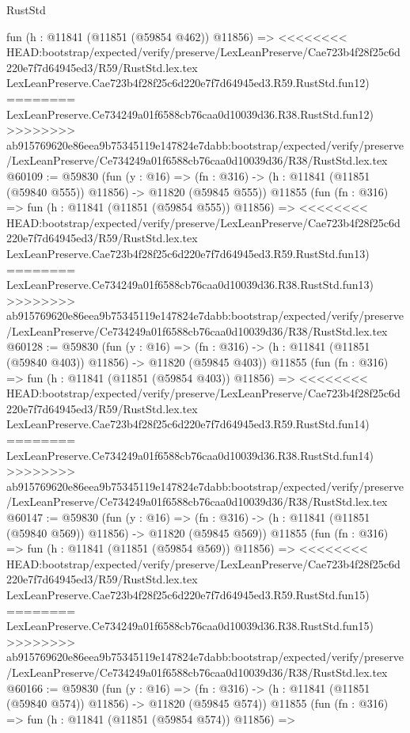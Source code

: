 \begin{lexlean}{RustStd}
\begin{coremodule}
{\begin{coremodule}
{{{{{{{{{{{{{{{{{{{{{{{{{{{{{{{{{{{{{{{{{{{{{{{{{{    fun (h : @11841 (@11851 (@59854 @462)) @11856) =>
<<<<<<<< HEAD:bootstrap/expected/verify/preserve/LexLeanPreserve/Cae723b4f28f25c6d220e7f7d64945ed3/R59/RustStd.lex.tex
    LexLeanPreserve.Cae723b4f28f25c6d220e7f7d64945ed3.R59.RustStd.fun12)
========
    LexLeanPreserve.Ce734249a01f6588cb76caa0d10039d36.R38.RustStd.fun12)
>>>>>>>> ab915769620e86eea9b75345119e147824e7dabb:bootstrap/expected/verify/preserve/LexLeanPreserve/Ce734249a01f6588cb76caa0d10039d36/R38/RustStd.lex.tex
@60109 := @59830
    (fun (y : @16) =>
    (fn : @316) -> (h : @11841 (@11851 (@59840 @555)) @11856) -> @11820 (@59845 @555))
    @11855
    (fun (fn : @316) =>
    fun (h : @11841 (@11851 (@59854 @555)) @11856) =>
<<<<<<<< HEAD:bootstrap/expected/verify/preserve/LexLeanPreserve/Cae723b4f28f25c6d220e7f7d64945ed3/R59/RustStd.lex.tex
    LexLeanPreserve.Cae723b4f28f25c6d220e7f7d64945ed3.R59.RustStd.fun13)
========
    LexLeanPreserve.Ce734249a01f6588cb76caa0d10039d36.R38.RustStd.fun13)
>>>>>>>> ab915769620e86eea9b75345119e147824e7dabb:bootstrap/expected/verify/preserve/LexLeanPreserve/Ce734249a01f6588cb76caa0d10039d36/R38/RustStd.lex.tex
@60128 := @59830
    (fun (y : @16) =>
    (fn : @316) -> (h : @11841 (@11851 (@59840 @403)) @11856) -> @11820 (@59845 @403))
    @11855
    (fun (fn : @316) =>
    fun (h : @11841 (@11851 (@59854 @403)) @11856) =>
<<<<<<<< HEAD:bootstrap/expected/verify/preserve/LexLeanPreserve/Cae723b4f28f25c6d220e7f7d64945ed3/R59/RustStd.lex.tex
    LexLeanPreserve.Cae723b4f28f25c6d220e7f7d64945ed3.R59.RustStd.fun14)
========
    LexLeanPreserve.Ce734249a01f6588cb76caa0d10039d36.R38.RustStd.fun14)
>>>>>>>> ab915769620e86eea9b75345119e147824e7dabb:bootstrap/expected/verify/preserve/LexLeanPreserve/Ce734249a01f6588cb76caa0d10039d36/R38/RustStd.lex.tex
@60147 := @59830
    (fun (y : @16) =>
    (fn : @316) -> (h : @11841 (@11851 (@59840 @569)) @11856) -> @11820 (@59845 @569))
    @11855
    (fun (fn : @316) =>
    fun (h : @11841 (@11851 (@59854 @569)) @11856) =>
<<<<<<<< HEAD:bootstrap/expected/verify/preserve/LexLeanPreserve/Cae723b4f28f25c6d220e7f7d64945ed3/R59/RustStd.lex.tex
    LexLeanPreserve.Cae723b4f28f25c6d220e7f7d64945ed3.R59.RustStd.fun15)
========
    LexLeanPreserve.Ce734249a01f6588cb76caa0d10039d36.R38.RustStd.fun15)
>>>>>>>> ab915769620e86eea9b75345119e147824e7dabb:bootstrap/expected/verify/preserve/LexLeanPreserve/Ce734249a01f6588cb76caa0d10039d36/R38/RustStd.lex.tex
@60166 := @59830
    (fun (y : @16) =>
    (fn : @316) -> (h : @11841 (@11851 (@59840 @574)) @11856) -> @11820 (@59845 @574))
    @11855
    (fun (fn : @316) =>
    fun (h : @11841 (@11851 (@59854 @574)) @11856) =>
}}}}}}}}}}}}}}}}}}}}}}}}}}}}}}}}}}}}}}}}}}}}}}}}}}
\end{coremodule}}
\end{coremodule}
\end{lexlean}
